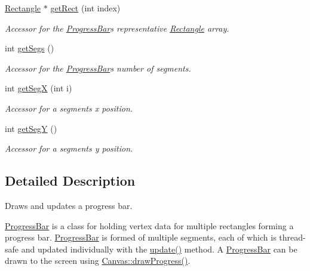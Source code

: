 \begin{DoxyCompactItemize}
\hyperlink{classtsgl_1_1_rectangle}{Rectangle} $\ast$ \hyperlink{classtsgl_1_1_progress_bar_aa360099f70e0c33c99f349cf28cbe610}{get\+Rect} (int index)
\begin{DoxyCompactList}\small\item\em Accessor for the \hyperlink{classtsgl_1_1_progress_bar}{Progress\+Bar}\textquotesingle{}s representative \hyperlink{classtsgl_1_1_rectangle}{Rectangle} array. \end{DoxyCompactList}\item 
int \hyperlink{classtsgl_1_1_progress_bar_a25576903783f18f8d74570aed2f80d95}{get\+Segs} ()
\begin{DoxyCompactList}\small\item\em Accessor for the \hyperlink{classtsgl_1_1_progress_bar}{Progress\+Bar}\textquotesingle{}s number of segments. \end{DoxyCompactList}\item 
int \hyperlink{classtsgl_1_1_progress_bar_a7ecdc35e44496db7cf2e25b2ee6577d4}{get\+Seg\+X} (int i)
\begin{DoxyCompactList}\small\item\em Accessor for a segment\textquotesingle{}s x position. \end{DoxyCompactList}\item 
int \hyperlink{classtsgl_1_1_progress_bar_a7efb6be08196ad2b48d4417a93d750ad}{get\+Seg\+Y} ()
\begin{DoxyCompactList}\small\item\em Accessor for a segment\textquotesingle{}s y position. \end{DoxyCompactList}\end{DoxyCompactItemize}


\subsection{Detailed Description}
Draws and updates a progress bar. 

\hyperlink{classtsgl_1_1_progress_bar}{Progress\+Bar} is a class for holding vertex data for multiple rectangles forming a progress bar. \hyperlink{classtsgl_1_1_progress_bar}{Progress\+Bar} is formed of multiple segments, each of which is thread-\/safe and updated individually with the \hyperlink{classtsgl_1_1_progress_bar_a4274998e4935f33eb9212b2174d9c0c5}{update()} method. A \hyperlink{classtsgl_1_1_progress_bar}{Progress\+Bar} can be drawn to the screen using \hyperlink{classtsgl_1_1_canvas_aea792059486ebe6d25d7f81bdadf751d}{Canvas\+::draw\+Progress()}. 

